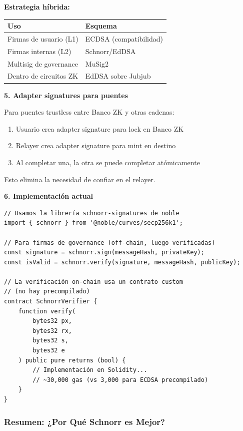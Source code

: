 \documentclass[11pt,a4paper,twoside,openright]{book}
\theoremstyle{definition}
\theoremstyle{plain}
\theoremstyle{remark}
\begin{document}
\begin{bancozk}
\textbf{Estrategia híbrida:}
\begin{center}
\begin{tabular}{ll}
\toprule
\textbf{Uso} & \textbf{Esquema} \\
\midrule
Firmas de usuario (L1) & ECDSA (compatibilidad) \\
Firmas internas (L2) & Schnorr/EdDSA \\
Multisig de governance & MuSig2 \\
Dentro de circuitos ZK & EdDSA sobre Jubjub \\
\bottomrule
\end{tabular}
\end{center}

\textbf{5. Adapter signatures para puentes}

Para puentes trustless entre Banco ZK y otras cadenas:
\begin{enumerate}
    \item Usuario crea adapter signature para lock en Banco ZK
    \item Relayer crea adapter signature para mint en destino
    \item Al completar una, la otra se puede completar atómicamente
\end{enumerate}

Esto elimina la necesidad de confiar en el relayer.

\textbf{6. Implementación actual}
\begin{verbatim}
// Usamos la librería schnorr-signatures de noble
import { schnorr } from '@noble/curves/secp256k1';

// Para firmas de governance (off-chain, luego verificadas)
const signature = schnorr.sign(messageHash, privateKey);
const isValid = schnorr.verify(signature, messageHash, publicKey);

// La verificación on-chain usa un contrato custom
// (no hay precompilado)
contract SchnorrVerifier {
    function verify(
        bytes32 px,
        bytes32 rx,
        bytes32 s,
        bytes32 e
    ) public pure returns (bool) {
        // Implementación en Solidity...
        // ~30,000 gas (vs 3,000 para ECDSA precompilado)
    }
}
\end{verbatim}
\end{bancozk}

\subsubsection{Resumen: ¿Por Qué Schnorr es Mejor?}
\end{document}

